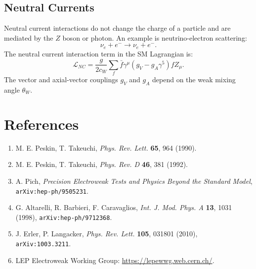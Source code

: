 \documentclass[a4paper,12pt]{article}
\begin{document}
\subsection{Neutral Currents}
 
Neutral current interactions do not change the charge of a particle and are mediated by the $Z$ boson or photon. An example is neutrino-electron scattering:
\begin{equation}
\nu_e + e^- \to \nu_e + e^-.
\end{equation}
The neutral current interaction term in the SM Lagrangian is:
\begin{equation}
\mathcal{L}_{NC} = \frac{g}{2c_W} \sum_f \bar{f} \gamma^\mu (g_V - g_A \gamma^5) f Z_\mu.
\end{equation}
The vector and axial-vector couplings $g_V$ and $g_A$ depend on the weak mixing angle $\theta_W$.
 
\section{References}
 
\begin{enumerate}
    \item M. E. Peskin, T. Takeuchi, \textit{Phys. Rev. Lett.} \textbf{65}, 964 (1990).
    \item M. E. Peskin, T. Takeuchi, \textit{Phys. Rev. D} \textbf{46}, 381 (1992).
    \item A. Pich, \textit{Precision Electroweak Tests and Physics Beyond the Standard Model}, \texttt{arXiv:hep-ph/9505231}.
    \item G. Altarelli, R. Barbieri, F. Caravaglios, \textit{Int. J. Mod. Phys. A} \textbf{13}, 1031 (1998), \texttt{arXiv:hep-ph/9712368}.
    \item J. Erler, P. Langacker, \textit{Phys. Rev. Lett.} \textbf{105}, 031801 (2010), \texttt{arXiv:1003.3211}.
    \item LEP Electroweak Working Group: \url{https://lepewwg.web.cern.ch/}.
\end{enumerate}
 
\end{document}
